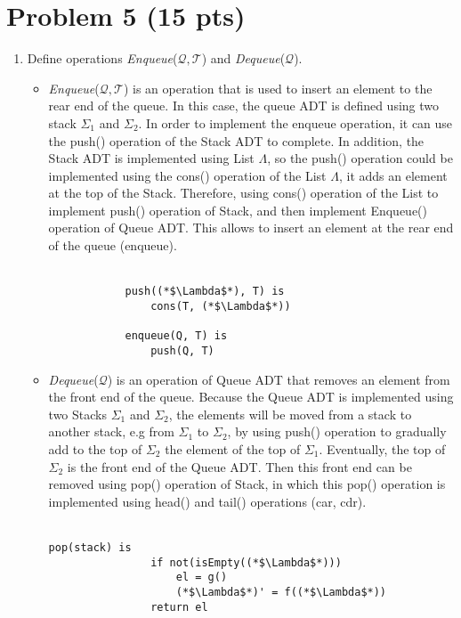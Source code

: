 \newpage


\section{Problem 5 (15 pts)}
\begin{enumerate}
    \item Define operations \textit{Enqueue}($\mathscr{Q}, \mathscr{T}$) and \textit{Dequeue}($\mathscr{Q}$).\\
    \begin{itemize}
        \item \textit{Enqueue}($\mathscr{Q}, \mathscr{T}$) is an operation that is used to insert an element to the rear end of the queue. In this case, the queue ADT is defined using two stack $\Sigma_{1}$ and $\Sigma_{2}$. In order to implement the enqueue operation, it can use the push() operation of the Stack ADT to complete. In addition, the Stack ADT is implemented using List $\Lambda$, so the push() operation could be implemented using the cons() operation of the List $\Lambda$, it adds an element at the top of the Stack. Therefore, using cons() operation of the List to implement push() operation of Stack, and then implement Enqueue() operation of Queue ADT. This allows to insert an element at the rear end of the queue (enqueue).\\ \\
        \begin{lstlisting}
            push((*$\Lambda$*), T) is
                cons(T, (*$\Lambda$*))
                
            enqueue(Q, T) is
                push(Q, T)
        \end{lstlisting}
        
        \item \textit{Dequeue}($\mathscr{Q}$) is an operation of Queue ADT that removes an element from the front end of the queue. Because the Queue ADT is implemented using two Stacks $\Sigma_{1}$ and $\Sigma_{2}$, the elements will be moved from a stack to another stack, e.g from $\Sigma_{1}$ to $\Sigma_{2}$, by using push() operation to gradually add to the top of $\Sigma_{2}$ the element of the top of $\Sigma_{1}$. Eventually, the top of $\Sigma_{2}$ is the front end of the Queue ADT. Then this front end can be removed using pop() operation of Stack, in which this pop() operation is implemented using head() and tail() operations (car, cdr).\\ \\
        \begin{lstlisting}[mathscape]
            pop(stack) is
                if not(isEmpty((*$\Lambda$*)))
                    el = g()
                    (*$\Lambda$*)' = f((*$\Lambda$*))
                return el


\end{lstlisting}
\end{itemize}
\end{enumerate}
